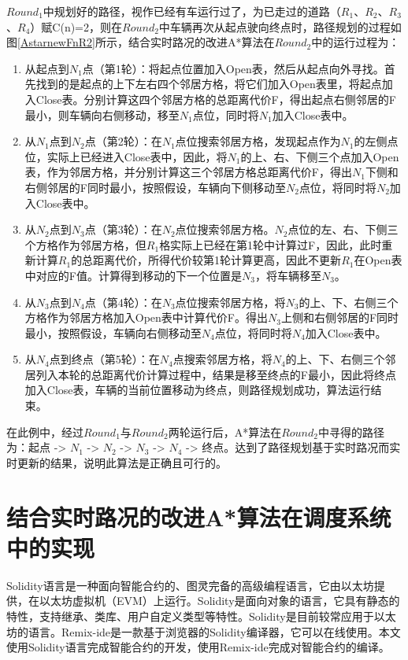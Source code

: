 $Round_1$中规划好的路径，视作已经有车运行过了，为已走过的道路（$R_1$、$R_2$、$R_3$、$R_4$）赋C(n)=2，则在$Round_2$中车辆再次从起点驶向终点时，路径规划的过程如图\ref{AstarnewFnR2}所示，结合实时路况的改进A*算法在$Round_2$中的运行过程为：

\begin{enumerate}
    \item 从起点到$N_1$点（第1轮）：将起点位置加入Open表，然后从起点向外寻找。首先找到的是起点的上下左右四个邻居方格，将它们加入Open表里，将起点加入Close表。分别计算这四个邻居方格的总距离代价F，得出起点右侧邻居的F最小，则车辆向右侧移动，移至$N_1$点位，同时将$N_1$加入Close表中。
    \item 从$N_1$点到$N_2$点（第2轮）：在$N_1$点位搜索邻居方格，发现起点作为$N_1$的左侧点位，实际上已经进入Close表中，因此，将$N_1$的上、右、下侧三个点加入Open表，作为邻居方格，并分别计算这三个邻居方格总距离代价F，得出$N_1$下侧和右侧邻居的F同时最小，按照假设，车辆向下侧移动至$N_2$点位，将同时将$N_2$加入Close表中。
    \item 从$N_2$点到$N_3$点（第3轮）：在$N_2$点位搜索邻居方格。$N_2$点位的左、右、下侧三个方格作为邻居方格，但$R_1$格实际上已经在第1轮中计算过F，因此，此时重新计算$R_1$的总距离代价，所得代价较第1轮计算更高，因此不更新$R_1$在Open表中对应的F值。计算得到移动的下一个位置是$N_3$，将车辆移至$N_3$。
    \item 从$N_3$点到$N_4$点（第4轮）：在$N_3$点位搜索邻居方格，将$N_3$的上、下、右侧三个方格作为邻居方格加入Open表中计算代价F。得出$N_3$上侧和右侧邻居的F同时最小，按照假设，车辆向右侧移动至$N_4$点位，将同时将$N_4$加入Close表中。
    \item 从$N_4$点到终点（第5轮）：在$N_4$点搜索邻居方格，将$N_4$的上、下、右侧三个邻居列入本轮的总距离代价计算过程中，结果是移至终点的F最小，因此将终点加入Close表，车辆的当前位置移动为终点，则路径规划成功，算法运行结束。
\end{enumerate}

在此例中，经过$Round_1$与$Round_2$两轮运行后，A*算法在$Round_2$中寻得的路径为：起点 -> $N_1$ -> $N_2$ -> $N_3$ -> $N_4$ -> 终点。达到了路径规划基于实时路况而实时更新的结果，说明此算法是正确且可行的。

\section{结合实时路况的改进A*算法在调度系统中的实现}
\label{section_useNewAstarinTaxiSystem}
Solidity语言是一种面向智能合约的、图灵完备的高级编程语言，它由以太坊提供，在以太坊虚拟机（EVM）上运行。Solidity是面向对象的语言，它具有静态的特性，支持继承、类库、用户自定义类型等特性。Solidity是目前较常应用于以太坊的语言。Remix-ide是一款基于浏览器的Solidity编译器，它可以在线使用。本文使用Solidity语言完成智能合约的开发，使用Remix-ide完成对智能合约的编译。


